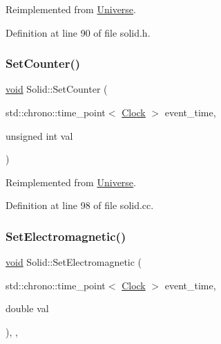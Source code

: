 Reimplemented from \mbox{\hyperlink{class_universe_a3b3da7c86a7b75e5e5c0b7972ac82a87}{Universe}}.



Definition at line 90 of file solid.\+h.

\mbox{\label{class_solid_aea949040518e505ed39b1456a360c5e0}} 
\subsubsection{\texorpdfstring{Set\+Counter()}{SetCounter()}}
{\footnotesize\ttfamily \mbox{\hyperlink{glad_8h_a950fc91edb4504f62f1c577bf4727c29}{void}} Solid\+::\+Set\+Counter (\begin{DoxyParamCaption}\item[{std\+::chrono\+::time\+\_\+point$<$ \mbox{\hyperlink{universe_8h_a0ef8d951d1ca5ab3cfaf7ab4c7a6fd80}{Clock}} $>$}]{event\+\_\+time,  }\item[{unsigned int}]{val }\end{DoxyParamCaption})\hspace{0.3cm}{\ttfamily [virtual]}}



Reimplemented from \mbox{\hyperlink{class_universe_aa22202ae740eb1355529afcb13285e91}{Universe}}.



Definition at line 98 of file solid.\+cc.

\mbox{\label{class_solid_a9a660f9d94f597712c67922aa1d4d795}} 
\subsubsection{\texorpdfstring{Set\+Electromagnetic()}{SetElectromagnetic()}}
{\footnotesize\ttfamily \mbox{\hyperlink{glad_8h_a950fc91edb4504f62f1c577bf4727c29}{void}} Solid\+::\+Set\+Electromagnetic (\begin{DoxyParamCaption}\item[{std\+::chrono\+::time\+\_\+point$<$ \mbox{\hyperlink{universe_8h_a0ef8d951d1ca5ab3cfaf7ab4c7a6fd80}{Clock}} $>$}]{event\+\_\+time,  }\item[{double}]{val }\end{DoxyParamCaption})\hspace{0.3cm}{\ttfamily [inline]}, {\ttfamily [final]}, {\ttfamily [virtual]}}



